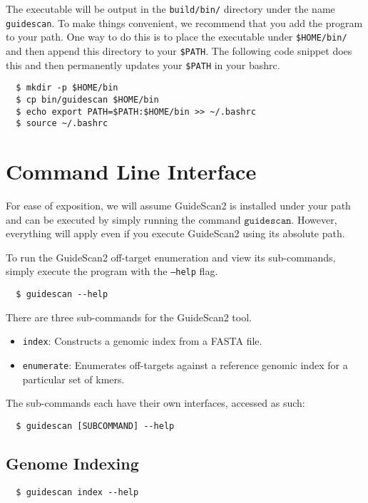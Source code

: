 \documentclass[10pt]{article}
\begin{document}
The executable will be output in the \texttt{build/bin/} directory
under the name \texttt{guidescan}. To make things convenient, we
recommend that you add the program to your path. One way to do this is
to place the executable under \texttt{\$HOME/bin/} and then append
this directory to your
\texttt{\$PATH}. The following code snippet does this and then
permanently updates your \texttt{\$PATH} in your bashrc.

\begin{verbatim}
  $ mkdir -p $HOME/bin
  $ cp bin/guidescan $HOME/bin
  $ echo export PATH=$PATH:$HOME/bin >> ~/.bashrc
  $ source ~/.bashrc
\end{verbatim}

\section{Command Line Interface}
For ease of exposition, we will assume GuideScan2 is installed under
your path and can be executed by simply running the command
$\texttt{guidescan}$. However, everything will apply even if you
execute GuideScan2 using its absolute path.

To run the GuideScan2 off-target enumeration and view its
sub-commands, simply execute the program with the \texttt{--help}
flag.
\begin{verbatim}
  $ guidescan --help
\end{verbatim}

There are three sub-commands for the GuideScan2 tool. 
\begin{itemize}
\item \texttt{index}: Constructs a genomic index from a FASTA file.
\item \texttt{enumerate}: Enumerates off-targets against a reference
  genomic index for a particular set of kmers. 
\end{itemize}
The sub-commands each have their own interfaces, accessed as such:
\begin{verbatim}
  $ guidescan [SUBCOMMAND] --help
\end{verbatim}

\subsection{Genome Indexing}

\begin{verbatim}
  $ guidescan index --help
\end{verbatim}
\end{document}
